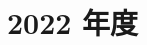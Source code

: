 \documentclass[../../hsm_tok_a.tex]{subfiles}
\begin{document}
    \section{2022 年度}

    

    \clearpage

    
\end{document}
